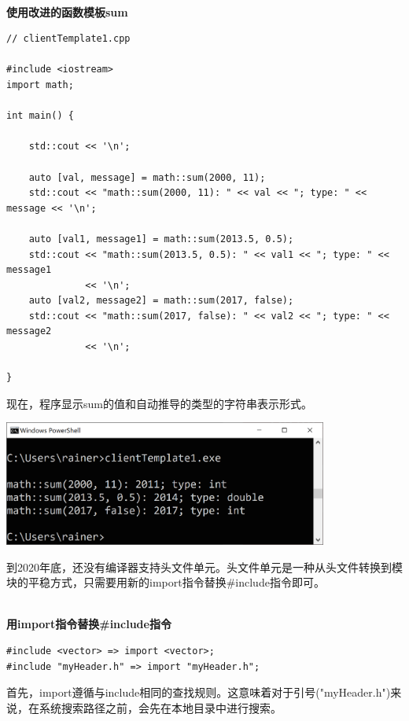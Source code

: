 \hspace*{\fill} \\ %
\noindent
\textbf{使用改进的函数模板sum}
\begin{lstlisting}[style=styleCXX]
// clientTemplate1.cpp

#include <iostream>
import math;

int main() {
	
	std::cout << '\n';
	
	auto [val, message] = math::sum(2000, 11);
	std::cout << "math::sum(2000, 11): " << val << "; type: " << message << '\n';
	
	auto [val1, message1] = math::sum(2013.5, 0.5);
	std::cout << "math::sum(2013.5, 0.5): " << val1 << "; type: " << message1
			  << '\n';
	auto [val2, message2] = math::sum(2017, false);
	std::cout << "math::sum(2017, false): " << val2 << "; type: " << message2
			  << '\n';

}
\end{lstlisting}

现在，程序显示sum的值和自动推导的类型的字符串表示形式。

\begin{center}
\includegraphics[width=0.8\textwidth]{content/3/chapter4/images/25.png}\\
\end{center}


到2020年底，还没有编译器支持头文件单元。头文件单元是一种从头文件转换到模块的平稳方式，只需要用新的import指令替换\#include指令即可。

\hspace*{\fill} \\ %
\noindent
\textbf{用import指令替换\#include指令}
\begin{lstlisting}[style=styleCXX]
#include <vector> => import <vector>;
#include "myHeader.h" => import "myHeader.h";
\end{lstlisting}

首先，import遵循与include相同的查找规则。这意味着对于引号("myHeader.h")来说，在系统搜索路径之前，会先在本地目录中进行搜索。

